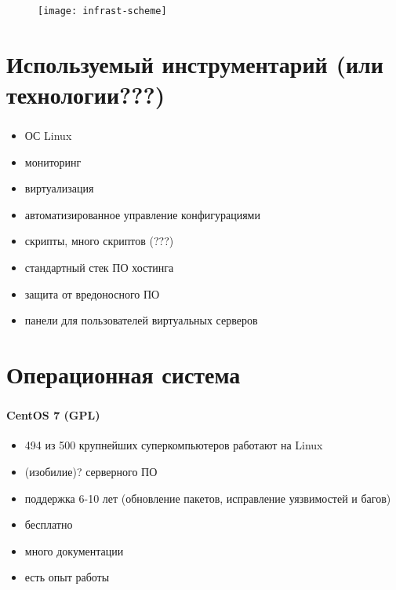 \begin{frame}
\frametitle{\insertsection}
\begin{figure}[h]
	\begin{center}
		\texttt{[image: infrast-scheme]}
	\end{center}
\end{figure}
\end{frame}


\section{Используемый инструментарий (или технологии???)}

\begin{frame}
\frametitle{\insertsection}
\begin{itemize}
	\item ОС Linux
	\item мониторинг
	\item виртуализация
	\item автоматизированное управление конфигурациями
	\item скрипты, много скриптов (???)
	\item стандартный стек ПО хостинга
	\item защита от вредоносного ПО
	\item панели для пользователей виртуальных серверов
\end{itemize}
\end{frame}


\section{Операционная система}

\begin{frame}
\frametitle{\insertsection}
\framesubtitle{CentOS 7 (GPL)}
\begin{itemize}
	\item 494 из 500 крупнейших суперкомпьютеров работают на Linux
	\item (изобилие)? серверного ПО
	\item поддержка 6-10 лет (обновление пакетов, исправление уязвимостей и багов)
	\item бесплатно
	\item много документации
	\item есть опыт работы
\end{itemize}
\end{frame}

